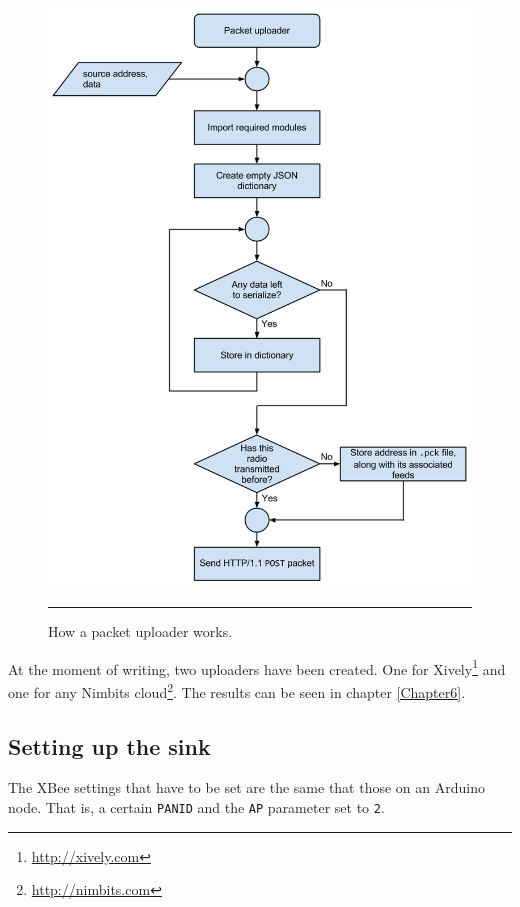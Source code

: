 \begin{figure}[htbp]
    \centering
        \includegraphics[scale=0.38]{./Figures/packet_uploader.png}
        \rule{35em}{0.5pt}
    \caption[Packet uploader flowchart]{How a packet uploader works.}
    \label{fig:puploader}
\end{figure}

At the moment of writing, two uploaders have been created. One for Xively\footnote{\url{http://xively.com}} and one for any Nimbits cloud\footnote{\url{http://nimbits.com}}. The results can be seen in chapter \ref{Chapter6}.

\subsection{Setting up the sink}

The XBee\textregistered{} settings that have to be set are the same that those on an Arduino node. That is, a certain \texttt{PANID} and the \texttt{AP} parameter set to \texttt{2}.

